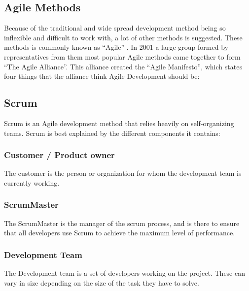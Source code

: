 \subsection{Agile Methods}
Because of the traditional and wide spread development method being so inflexible and difficult to work with, a lot of other methods is suggested.
These methods is commonly known as ``Agile'' \cite{agileManifesto}.
In 2001 a large group formed by representatives from them most popular Agile methods came together to form ``The Agile Alliance''.
This alliance created the ``Agile Manifesto'', which states four things that the alliance think Agile Development should be:


\subsection{Scrum}
Scrum is an Agile development method that relies heavily on self-organizing teams. Scrum is best explained by the different components it contains:

\subsubsection{Customer / Product owner}
The customer is the person or organization for whom the development team is currently working.

\subsubsection{ScrumMaster}
The ScrumMaster is the manager of the scrum process, and is there to ensure that all developers use Scrum to achieve the maximum level of performance.

\subsubsection{Development Team}
The Development team is a set of developers working on the project. These can vary in size depending on the size of the task they have to solve.

